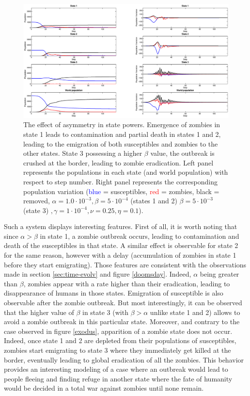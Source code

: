 \documentclass[11pt]{article} %
\begin{document}
\begin{figure}[h!]
\centerline{
\includegraphics[scale=0.35]{../images/Matlab_figures/asymmetric-system.eps}}
\caption{The effect of asymmetry in state powers.  Emergence of zombies in state 1 leads to contamination and partial death in states 1 and 2, leading to the emigration of both susceptibles and zombies to the other states.  State 3 possessing a higher $\beta$ value, the outbreak is crushed at the border, leading to zombie eradication. Left panel represents the populations in each state (and world population) with respect to step number. Right panel represents the corresponding population variation (\textcolor{blue}{blue} = susceptibles, \textcolor{red}{red} = zombies, black = removed, $\alpha=1.0\cdot10^{-3}, \beta=5\cdot10^{-4} $ (states 1 and 2) $\beta=5\cdot10^{-3}$ (state 3) $, \gamma=1\cdot10^{-4}, \nu=0.25, \eta=0.1$). \label{basym} }
\end{figure}

Such a system displays interesting features. First of all, it is worth noting that since $\alpha>\beta$ in state 1, a zombie outbreak occurs, leading to contamination and death of the susceptibles in that state. A similar effect is observable for state 2 for the same reason, however with a delay (accumulation of zombies in state 1 before they start emigrating). Those features are consistent with the observations made in section \ref{sec:time-evolv} and figure \ref{doomsday}. Indeed, $\alpha$ being greater than $\beta$, zombies appear with a rate higher than their eradication, leading to disappearance of humans in those states. Emigration of susceptible is also observable after the zombie outbreak. But most interestingly, it can be observed that the higher value of $\beta$ in state 3 (with $\beta>\alpha$ unlike state 1 and 2) allows to avoid a zombie outbreak in this particular state. Moreover, and contrary to the case observed in figure \ref{exodus}, apparition of a zombie state does not occur. Indeed, once state 1 and 2 are depleted from their populations of susceptibles, zombies start emigrating to state 3 where they immediately get killed at the border, eventually leading to global eradication of all the zombies. This behavior provides an interesting modeling of a case where an outbreak would lead to people fleeing and finding refuge in another state where the fate of humanity would be decided in a total war against zombies until none remain.
\end{document}
